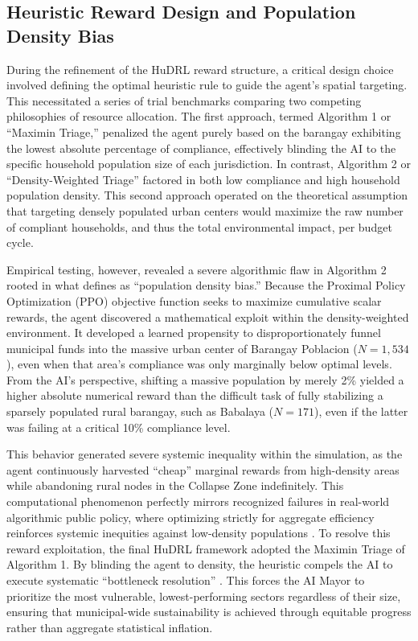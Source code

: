 \subsection{Heuristic Reward Design and Population Density Bias}
During the refinement of the HuDRL reward structure, a critical design choice involved defining the optimal heuristic rule to guide the agent's spatial targeting. This necessitated a series of trial benchmarks comparing two competing philosophies of resource allocation. The first approach, termed Algorithm 1 or ``Maximin Triage,'' penalized the agent purely based on the barangay exhibiting the lowest absolute percentage of compliance, effectively blinding the AI to the specific household population size of each jurisdiction. In contrast, Algorithm 2 or ``Density-Weighted Triage'' factored in both low compliance and high household population density. This second approach operated on the theoretical assumption that targeting densely populated urban centers would maximize the raw number of compliant households, and thus the total environmental impact, per budget cycle.

Empirical testing, however, revealed a severe algorithmic flaw in Algorithm 2 rooted in what \cite{Mehrabi2021} defines as ``population density bias.'' Because the Proximal Policy Optimization (PPO) objective function seeks to maximize cumulative scalar rewards, the agent discovered a mathematical exploit within the density-weighted environment. It developed a learned propensity to disproportionately funnel municipal funds into the massive urban center of Barangay Poblacion ($N=1,534$), even when that area’s compliance was only marginally below optimal levels. From the AI's perspective, shifting a massive population by merely 2\% yielded a higher absolute numerical reward than the difficult task of fully stabilizing a sparsely populated rural barangay, such as Babalaya ($N=171$), even if the latter was failing at a critical 10\% compliance level.

This behavior generated severe systemic inequality within the simulation, as the agent continuously harvested ``cheap'' marginal rewards from high-density areas while abandoning rural nodes in the Collapse Zone indefinitely. This computational phenomenon perfectly mirrors recognized failures in real-world algorithmic public policy, where optimizing strictly for aggregate efficiency reinforces systemic inequities against low-density populations \citep{Alphonso2024}. To resolve this reward exploitation, the final HuDRL framework adopted the Maximin Triage of Algorithm 1. By blinding the agent to density, the heuristic compels the AI to execute systematic ``bottleneck resolution'' \citep{TianReview2024}. This forces the AI Mayor to prioritize the most vulnerable, lowest-performing sectors regardless of their size, ensuring that municipal-wide sustainability is achieved through equitable progress rather than aggregate statistical inflation.

